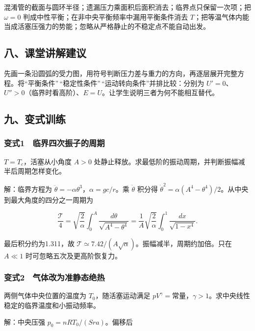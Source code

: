 \documentclass[12pt,a4paper,fontset=fandol]{ctexart}
\begin{document}
混淆管的截面与圆环半径；遗漏压力乘面积后面积消去；临界点只保留一次项；把
\(\omega=0\) 判成中性平衡；在非中央平衡频率中漏用平衡条件消去
\(T\)；把等温气体内能当成活塞压强力的势能；忽略从严格静止的不稳定点不能自动出发。

\subsection{八、课堂讲解建议}\label{ux516bux8bfeux5802ux8bb2ux89e3ux5efaux8bae-1}

先画一条沿圆弧的受力图，用符号判断压力差与重力的方向，再逐层展开完整方程。将``平衡条件''\,``稳定性条件''\,``运动转向条件''并排比较：分别为
\(U'=0\)、\(U''>0\)（临界时看高阶）、\(E=U\)。让学生说明三者为何不能相互替代。

\subsection{九、变式训练}\label{ux4e5dux53d8ux5f0fux8badux7ec3-1}

\subsubsection{变式1　临界四次振子的周期}\label{ux53d8ux5f0f1-ux4e34ux754cux56dbux6b21ux632fux5b50ux7684ux5468ux671f}

\(T=T_c\)，活塞从小角度 \(A>0\)
处静止释放。求最低阶的振动周期，并判断振幅减半后周期怎样变化。

解：临界方程为 \(\ddot\theta=-\alpha\theta^3\)，\(\alpha=gc/r\)。乘
\(\dot\theta\) 积分得
\(\dot\theta^2=\alpha(A^4-\theta^4)/2\)。从中央到最大角度的四分之一周期为

\[\frac{\mathcal T}{4}=\sqrt{\frac2\alpha}\int_0^A
\frac{d\theta}{\sqrt{A^4-\theta^4}}
=\frac1A\sqrt{\frac2\alpha}\int_0^1\frac{dx}{\sqrt{1-x^4}}.\]

最后积分约为1.311，故
\(\mathcal T\simeq7.42/(A\sqrt\alpha)\)。振幅减半，周期约加倍。只在
\(A\ll1\) 时可忽略五次及更高阶恢复力。

\subsubsection{变式2　气体改为准静态绝热}\label{ux53d8ux5f0f2-ux6c14ux4f53ux6539ux4e3aux51c6ux9759ux6001ux7eddux70ed}

两侧气体中央位置的温度为 \(T_0\)，随活塞运动满足
\(pV^\gamma=\)常量，\(\gamma>1\)。求中央线性稳定的临界温度和小振动频率。

解：中央压强 \(p_0=nRT_0/(Sra)\)。偏移后
\end{document}

